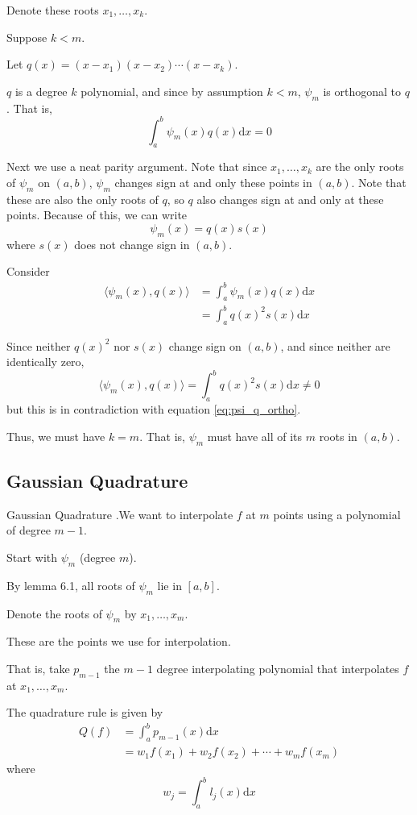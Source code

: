 \documentclass[12pt,letterpaper]{article}
\newcommand{\dd}{\mathrm{d}}
\begin{document}
Denote these roots $x_1, \dots, x_k$.

Suppose $k < m$.

Let $q(x) = (x-x_1)(x-x_2) \cdots (x-x_k)$.

$q$ is a degree $k$ polynomial, and since by assumption $k < m$, $\psi_m$ is orthogonal to $q$. That is,
\begin{equation}\label{eq:psi_q_ortho}
	\int_a^b \psi_m(x) q(x) \dd x = 0
\end{equation}

Next we use a neat parity argument. Note that since $x_1, \dots, x_k$ are the only roots of $\psi_m$ on $(a,b)$, $\psi_m$ changes sign at and only these points in $(a,b)$. Note that these are also the only roots of $q$, so $q$ also changes sign at and only at these points. Because of this, we can write
\begin{equation}
	\psi_m(x) = q(x) s(x)
\end{equation}
where $s(x)$ does not change sign in $(a,b)$.

Consider
\begin{align}
	\langle \psi_m(x), q(x) \rangle &= \int_a^b \psi_m(x) q(x) \dd x \\
	&= \int_a^b q(x)^2 s(x) \dd x
\end{align}

Since neither $q(x)^2$ nor $s(x)$ change sign on $(a,b)$, and since neither are identically zero,
\begin{equation}
	\langle \psi_m(x), q(x) \rangle = \int_a^b q(x)^2 s(x) \dd x \neq 0
\end{equation}
but this is in contradiction with equation \ref{eq:psi_q_ortho}.

Thus, we must have $k = m$. That is, $\psi_m$ must have all of its $m$ roots in $(a,b)$.


\subsection{Gaussian Quadrature}
\begin{defn}{Gaussian Quadrature}
.We want to interpolate $f$ at $m$ points using a polynomial of degree $m-1$.

Start with $\psi_m$ (degree $m$).

By lemma 6.1, all roots of $\psi_m$ lie in $[a, b]$.

Denote the roots of $\psi_m$ by $x_1, \dots, x_m$.

These are the points we use for interpolation.

That is, take $p_{m-1}$ the $m-1$ degree interpolating polynomial that interpolates $f$ at $x_1, \dots, x_m$.

The quadrature rule is given by
\begin{align}
	Q(f) &= \int_a^b p_{m-1}(x) \dd x \\
	&= w_1 f(x_1) + w_2 f(x_2) + \cdots + w_m f(x_m)
\end{align}
where
\begin{equation}
	w_j = \int_a^b l_j(x) \dd x
\end{equation}
\label{def:gauss_quad}
\end{defn}
\end{document}
